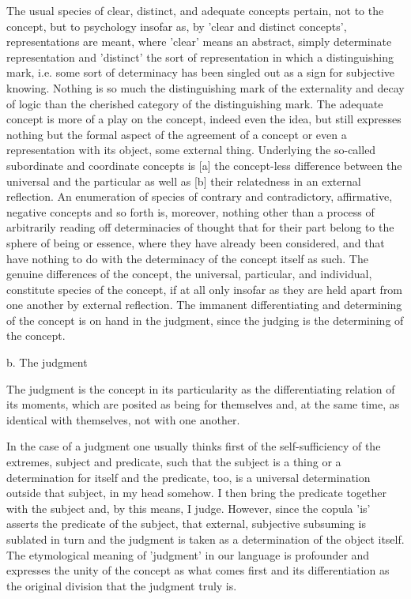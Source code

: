 The usual species of clear, distinct, and adequate concepts pertain,
not to the concept, but to psychology insofar as,
by 'clear and distinct concepts', representations are meant,
where 'clear' means an abstract, simply determinate representation
and 'distinct' the sort of representation in which a distinguishing mark,
i.e. some sort of determinacy has been singled out
as a sign for subjective knowing.
Nothing is so much the distinguishing mark of the externality and
decay of logic than the cherished category of the distinguishing mark.
The adequate concept is more of a play on the concept,
indeed even the idea, but still expresses nothing
but the formal aspect of the agreement of a concept
or even a representation with its object, some external thing.
Underlying the so-called subordinate and coordinate concepts is
[a] the concept-less difference between the universal and the particular
as well as [b] their relatedness in an external reflection.
An enumeration of species of contrary and contradictory,
affirmative, negative concepts and so forth is, moreover,
nothing other than a process of arbitrarily reading off
determinacies of thought that for their part belong to
the sphere of being or essence,
where they have already been considered,
and that have nothing to do
with the determinacy of the concept itself as such.
The genuine differences of the concept,
the universal, particular, and individual,
constitute species of the concept,
if at all only insofar as they are held apart
from one another by external reflection.
The immanent differentiating and determining of
the concept is on hand in the judgment,
since the judging is the determining of the concept.

b. The judgment

The judgment is the concept in its particularity as
the differentiating relation of its moments,
which are posited as being for themselves
and, at the same time, as
identical with themselves,
not with one another.

In the case of a judgment one usually thinks first of
the self-sufficiency of the extremes, subject and predicate,
such that the subject is a thing or a determination for itself
and the predicate, too, is a universal determination
outside that subject, in my head somehow.
I then bring the predicate together with the subject
and, by this means, I judge.
However, since the copula 'is' asserts the predicate of the subject,
that external, subjective subsuming is sublated in turn
and the judgment is taken as a determination of the object itself.
The etymological meaning of 'judgment' in our language is
profounder and expresses the unity of the concept as what comes first
and its differentiation as the original division
that the judgment truly is.

